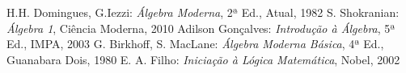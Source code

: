 \cleardoublepage
{}
{}
\renewcommand{\bibname}{Bibliografia}

\begin{thebibliography}{99}
 H.H. Domingues, G.Iezzi: \textit{{\'A}lgebra Moderna}, 2ª Ed., Atual, 1982
 S. Shokranian: \textit{{\'A}lgebra 1}, Ci{\^e}ncia Moderna, 2010
 Adilson Gon{\c c}alves: \textit{Introdu{\c c}{\~a}o {\`a} {\'A}lgebra}, 5ª Ed., IMPA, 2003
 G. Birkhoff, S. MacLane: \textit{{\'A}lgebra Moderna B{\'a}sica}, 4ª Ed., Guanabara Dois, 1980
 E. A. Filho: \textit{Inicia{\c c}{\~a}o {\`a} L{\'o}gica Matem{\'a}tica}, Nobel, 2002
\end{thebibliography}